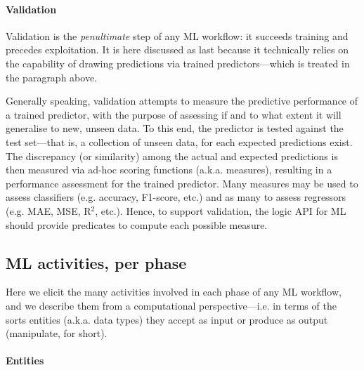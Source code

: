 \documentclass[runningheads]{llncs}
\begin{document}
\paragraph{Validation}
%
Validation is the \emph{penultimate} step of any ML workflow: it succeeds training and precedes exploitation.
%
It is here discussed as last because it technically relies on the capability of drawing predictions via trained predictors---which is treated in the paragraph above.

Generally speaking, validation attempts to measure the predictive performance of a trained predictor, with the purpose of assessing if and to what extent it will generalise to new, unseen data.
%
To this end, the predictor is tested against the test set---that is, a collection of unseen data, for each expected predictions exist.
%
The discrepancy (or similarity) among the actual and expected predictions is then measured via ad-hoc scoring functions (a.k.a. measures), resulting in a performance assessment for the trained predictor.
%
Many measures may be used to assess classifiers (e.g. accuracy, F1-score, etc.) and as many to assess regressors (e.g. MAE, MSE, R$^2$, etc.).
%
Hence, to support validation, the logic API for ML should provide predicates to compute each possible measure.

\subsection{ML activities, per phase}
\label{ssec:modelling}

Here we elicit the many activities involved in each phase of any ML workflow, and we describe them from a computational perspective---i.e. in terms of the sorts entities (a.k.a. data types) they accept as input or produce as output (manipulate, for short).

\paragraph{Entities}
\end{document}
